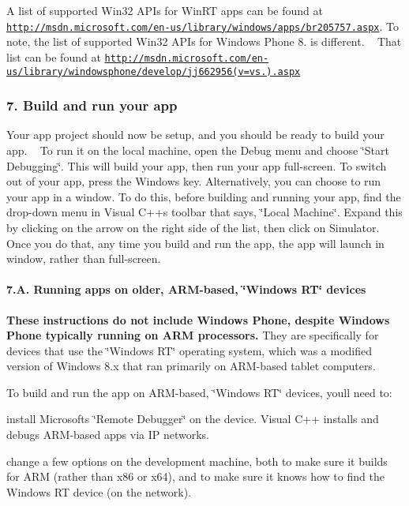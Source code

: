 A list of supported Win32 A\+P\+Is for Win\+RT apps can be found at \href{http://msdn.microsoft.com/en-us/library/windows/apps/br205757.aspx}{\tt http\+://msdn.\+microsoft.\+com/en-\/us/library/windows/apps/br205757.\+aspx}. To note, the list of supported Win32 A\+P\+Is for Windows Phone 8. is different. ~\newline
That list can be found at \href{http://msdn.microsoft.com/en-us/library/windowsphone/develop/jj662956(v=vs.105).aspx}{\tt http\+://msdn.\+microsoft.\+com/en-\/us/library/windowsphone/develop/jj662956(v=vs.).\+aspx}

\subsubsection*{7. Build and run your app}

Your app project should now be setup, and you should be ready to build your app. ~\newline
To run it on the local machine, open the Debug menu and choose \char`\"{}\+Start 
\+Debugging\char`\"{}. This will build your app, then run your app full-\/screen. To switch out of your app, press the Windows key. Alternatively, you can choose to run your app in a window. To do this, before building and running your app, find the drop-\/down menu in Visual C++\textquotesingle{}s toolbar that says, \char`\"{}\+Local Machine\char`\"{}. Expand this by clicking on the arrow on the right side of the list, then click on Simulator. Once you do that, any time you build and run the app, the app will launch in window, rather than full-\/screen.

\paragraph*{7.\+A. Running apps on older, A\+R\+M-\/based, \char`\"{}\+Windows R\+T\char`\"{} devices}

{\bfseries These instructions do not include Windows Phone, despite Windows Phone typically running on A\+RM processors.} They are specifically for devices that use the \char`\"{}\+Windows R\+T\char`\"{} operating system, which was a modified version of Windows 8.\+x that ran primarily on A\+R\+M-\/based tablet computers.

To build and run the app on A\+R\+M-\/based, \char`\"{}\+Windows R\+T\char`\"{} devices, you\textquotesingle{}ll need to\+:


\begin{DoxyItemize}
\item install Microsoft\textquotesingle{}s \char`\"{}\+Remote Debugger\char`\"{} on the device. Visual C++ installs and debugs A\+R\+M-\/based apps via IP networks.
\item change a few options on the development machine, both to make sure it builds for A\+RM (rather than x86 or x64), and to make sure it knows how to find the Windows RT device (on the network).
\end{DoxyItemize}

